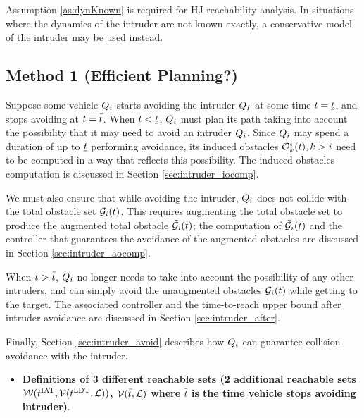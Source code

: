 Assumption \ref{as:dynKnown} is required for HJ reachability analysis. In situations where the dynamics of the intruder are not known exactly, a conservative model of the intruder may be used instead.

\subsection{Method 1 (Efficient Planning?)}
Suppose some vehicle $Q_{i}$ starts avoiding the intruder $Q_{I}$ at some time $t = \underline{t}$, and stops avoiding at $t = \bar{t}$. When $t < \underline{t}$, $Q_{i}$ must plan its path taking into account the possibility that it may need to avoid an intruder $Q_{i}$. Since $Q_{i}$ may spend a duration of up to $\underline{t}$ performing avoidance, its induced obstacles $\mathcal{O}_k^i(t), k>i$ need to be computed in a way that reflects this possibility. The induced obstacles computation is discussed in Section \ref{sec:intruder_iocomp}.

We must also ensure that while avoiding the intruder, $Q_{i}$ does not collide with the total obstacle set $\mathcal{G}_i(t)$. This requires augmenting the total obstacle set to produce the augmented total obstacle $\tilde{\mathcal{G}}_i(t)$; the computation of $\tilde{\mathcal{G}}_i(t)$ and the controller that guarantees the avoidance of the augmented obstacles are discussed in Section \ref{sec:intruder_aocomp}.

When $t > \bar{t}$, $Q_{i}$ no longer needs to take into account the possibility of any other intruders, and can simply avoid the unaugmented obstacles $\mathcal{G}_i(t)$ while getting to the target. The associated controller and the time-to-reach upper bound after intruder avoidance are discussed in Section \ref{sec:intruder_after}.

Finally, Section \ref{sec:intruder_avoid} describes how $Q_{i}$ can guarantee collision avoidance with the intruder.

\begin{itemize}
\item \textbf{Definitions of 3 different reachable sets (2 additional reachable sets $\mathcal{W}(t^\text{IAT}, \mathcal{V}(t^\text{LDT}, \mathcal{L}))$, $\mathcal{V}(\bar t, \mathcal{L})$ where $\bar t$ is the time vehicle stops avoiding intruder)}.
\end{itemize}

